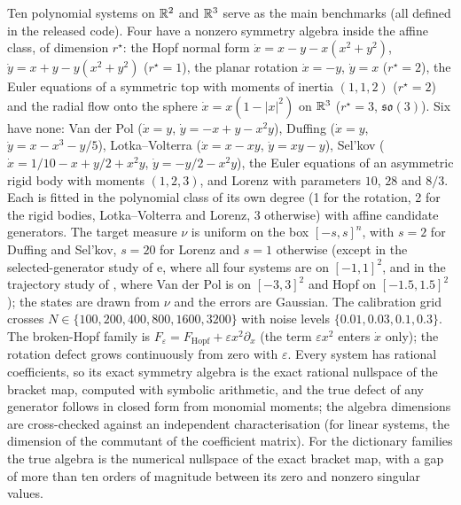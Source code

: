 Ten polynomial systems on $\mathbb{R}^2$ and $\mathbb{R}^3$ serve as the main benchmarks (all
defined in the released code). Four have a nonzero symmetry algebra inside the
affine class, of dimension $r^\star$: the Hopf normal form $\dot x = x - y -
x(x^2+y^2)$, $\dot y = x + y - y(x^2+y^2)$ ($r^\star = 1$), the planar rotation
$\dot x = -y$, $\dot y = x$ ($r^\star = 2$), the Euler equations of a symmetric
top with moments of inertia $(1,1,2)$ ($r^\star = 2$) and the radial flow onto
the sphere $\dot x = x(1-|x|^2)$ on $\mathbb{R}^3$ ($r^\star = 3$,
$\mathfrak{so}(3)$). Six have none: Van der Pol ($\dot x = y$, $\dot y = -x + y
- x^2y$), Duffing ($\dot x = y$, $\dot y = x - x^3 - y/5$), Lotka--Volterra
($\dot x = x - xy$, $\dot y = xy - y$), Sel'kov ($\dot x = 1/10 - x + y/2 +
x^2y$, $\dot y = -y/2 - x^2y$), the Euler equations of an asymmetric rigid body
with moments $(1,2,3)$, and Lorenz with parameters $10$, $28$ and $8/3$. Each is
fitted in the polynomial class of its own degree (1 for the rotation, 2 for the
rigid bodies, Lotka--Volterra and Lorenz, 3 otherwise) with affine candidate
generators. The target measure $\nu$ is uniform on the box $[-s,s]^n$, with $s
= 2$ for Duffing and Sel'kov, $s = 20$ for Lorenz and $s = 1$ otherwise
(except in the selected-generator study of \SFtightness e, where all four
systems are on $[-1,1]^2$, and in the trajectory study of \STtrajectory, where
Van der Pol is on $[-3,3]^2$ and Hopf on $[-1.5,1.5]^2$); the states are drawn from $\nu$ and the errors are
Gaussian. The calibration grid
crosses $N \in \{100, 200, 400, 800, 1600, 3200\}$ with noise levels $\{0.01,
0.03, 0.1, 0.3\}$. The broken-Hopf family is $F_\varepsilon = F_{\mathrm{Hopf}}
+ \varepsilon x^2\partial_x$ (the term $\varepsilon x^2$ enters $\dot x$ only);
the rotation defect grows continuously from zero with $\varepsilon$. Every system has rational coefficients, so its exact symmetry
algebra is the exact rational nullspace of the bracket map, computed with
symbolic arithmetic, and the true defect of any generator follows in closed
form from monomial moments; the algebra dimensions are cross-checked against
an independent characterisation (for linear systems, the dimension of the
commutant of the coefficient matrix). For the dictionary families the true
algebra is the numerical nullspace of the exact bracket map, with a gap of
more than ten orders of magnitude between its zero and nonzero singular values.

